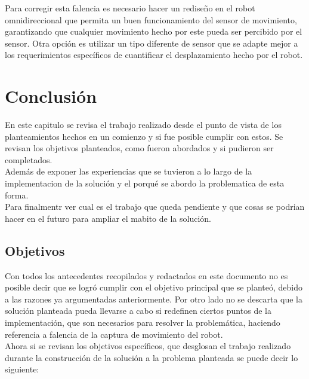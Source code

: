 \documentclass{iccmemoria}
\begin{document}
Para corregir esta falencia es necesario hacer un rediseño en el robot omnidireccional que permita un buen funcionamiento del sensor de movimiento, garantizando que cualquier movimiento hecho por este pueda ser percibido por el sensor. Otra opción es utilizar un tipo diferente de sensor que se adapte mejor a los requerimientos específicos de cuantificar el desplazamiento hecho por el robot.\\

\chapter{Conclusión}

En este capitulo se revisa el trabajo realizado desde el punto de vista de los planteamientos hechos en un comienzo y si fue posible cumplir con estos. Se revisan los objetivos planteados, como fueron abordados y si pudieron ser completados.\\

Además de exponer las experiencias que se tuvieron a lo largo de la implementacion de la solución y el porqué se abordo la problematica de esta forma.\\

Para finalmentr ver cual es el trabajo que queda pendiente y que cosas se podrian hacer en el futuro para ampliar el mabito de la solución.\\

\section{Objetivos}

Con todos los antecedentes recopilados y redactados en este documento no es posible decir que se logró cumplir con el objetivo principal que se planteó, debido a las razones ya argumentadas anteriormente. Por otro lado no se descarta que la solución planteada pueda llevarse a cabo si redefinen ciertos puntos de la implementación, que son necesarios para resolver la problemática, haciendo referencia a falencia de la captura de movimiento del robot.\\

Ahora si se revisan los objetivos específicos, que desglosan el trabajo realizado durante la construcción de la solución a la problema planteada se puede decir lo siguiente:
\end{document}
